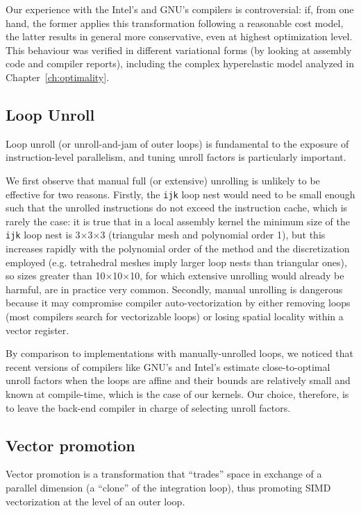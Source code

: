 Our experience with the Intel's and GNU's compilers is controversial: if, from one hand, the former applies this transformation following a reasonable cost model, the latter results in general more conservative, even at highest optimization level. This behaviour was verified in different variational forms (by looking at assembly code and compiler reports), including the complex hyperelastic model analyzed in Chapter~\ref{ch:optimality}.

\subsection{Loop Unroll}
Loop unroll (or unroll-and-jam of outer loops) is fundamental to the exposure of instruction-level parallelism, and tuning unroll factors is particularly important.

We first observe that manual full (or extensive) unrolling is unlikely to be effective for two reasons. Firstly, the \texttt{ijk} loop nest would need to be small enough such that the unrolled instructions do not exceed the instruction cache, which is rarely the case: it is true that in a local assembly kernel the minimum size of the \texttt{ijk} loop nest is 3$\times$3$\times$3 (triangular mesh and polynomial order 1), but this increases rapidly with the polynomial order of the method and the discretization employed (e.g. tetrahedral meshes imply larger loop nests than triangular ones), so sizes greater than 10$\times$10$\times$10, for which extensive unrolling would already be harmful, are in practice very common. Secondly, manual unrolling is dangerous because it may compromise compiler auto-vectorization by either removing loops (most compilers search for vectorizable loops) or losing spatial locality within a vector register.

By comparison to implementations with manually-unrolled loops, we noticed that recent versions of compilers like GNU's and Intel's estimate close-to-optimal unroll factors when the loops are affine and their bounds are relatively small and known at compile-time, which is the case of our kernels. Our choice, therefore, is to leave the back-end compiler in charge of selecting unroll factors.

\subsection{Vector promotion}
\label{sec:coffee-precompute}
Vector promotion is a transformation that ``trades'' space in exchange of a parallel dimension (a ``clone'' of the integration loop), thus promoting SIMD vectorization at the level of an outer loop.

